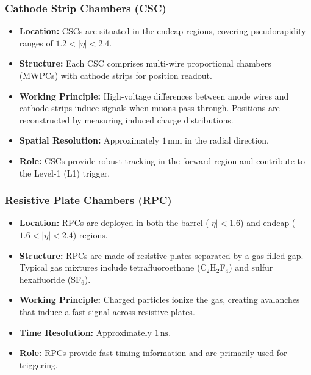 \subsubsection{Cathode Strip Chambers (CSC)}
\begin{itemize}
	\item \textbf{Location:} CSCs are situated in the endcap regions, covering pseudorapidity ranges of $1.2 < |\eta| < 2.4$.
	\item \textbf{Structure:} Each CSC comprises multi-wire proportional chambers (MWPCs) with cathode strips for position readout.
	\item \textbf{Working Principle:} High-voltage differences between anode wires and cathode strips induce signals when muons pass through. Positions are reconstructed by measuring induced charge distributions.
	\item \textbf{Spatial Resolution:} Approximately $1\,\mathrm{mm}$ in the radial direction.
	\item \textbf{Role:} CSCs provide robust tracking in the forward region and contribute to the Level-1 (L1) trigger.
\end{itemize}

\subsubsection{Resistive Plate Chambers (RPC)}
\begin{itemize}
	\item \textbf{Location:} RPCs are deployed in both the barrel ($|\eta| < 1.6$) and endcap ($1.6 < |\eta| < 2.4$) regions.
	\item \textbf{Structure:} RPCs are made of resistive plates separated by a gas-filled gap. Typical gas mixtures include tetrafluoroethane (C$_2$H$_2$F$_4$) and sulfur hexafluoride (SF$_6$).
	\item \textbf{Working Principle:} Charged particles ionize the gas, creating avalanches that induce a fast signal across resistive plates.
	\item \textbf{Time Resolution:} Approximately $1\,\mathrm{ns}$.
	\item \textbf{Role:} RPCs provide fast timing information and are primarily used for triggering.
\end{itemize}


